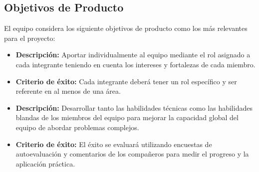 \subsection{Objetivos de Producto}\label{sec:objetivosDeProducto}

El equipo considera los siguiente objetivos de producto como los más relevantes para el proyecto: 
\begin{itemize}
    \item \textbf{Descripción:} Aportar individualmente al equipo mediante el rol asignado a cada integrante teniendo en cuenta los intereses y fortalezas de cada miembro.
    \item \textbf{Criterio de éxito:} Cada integrante deberá tener un rol específico y ser referente en al menos de una área.
    \vspace{0.5cm}
    \item \textbf{Descripción:} Desarrollar tanto las habilidades técnicas como las habilidades blandas de los miembros del equipo para mejorar la capacidad global del equipo de abordar problemas complejos.
    \item \textbf{Criterio de éxito:} El éxito se evaluará utilizando encuestas de autoevaluación y comentarios de los compañeros para medir el progreso y la aplicación práctica. 
\end{itemize}